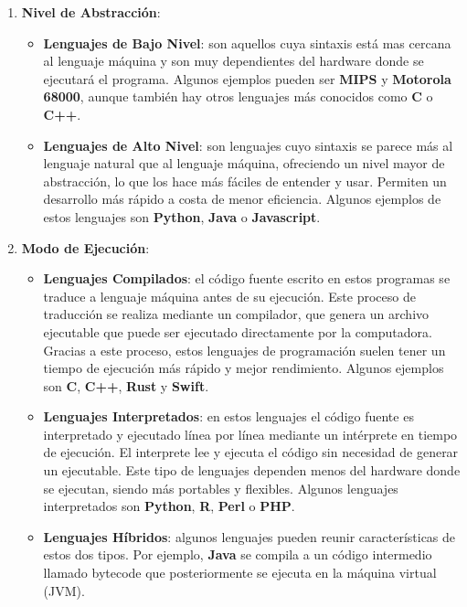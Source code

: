 \begin{enumerate}
	\item \textbf{Nivel de Abstracción}:
		\begin{itemize}
			\item \textbf{Lenguajes de Bajo Nivel}: son aquellos cuya sintaxis está mas cercana al lenguaje máquina y son muy dependientes del hardware donde se ejecutará el programa. Algunos ejemplos pueden ser \textbf{MIPS} y \textbf{Motorola 68000}, aunque también hay otros lenguajes más conocidos como \textbf{C} o \textbf{C++}. 
			
			\item \textbf{Lenguajes de Alto Nivel}: son lenguajes cuyo sintaxis se parece más al lenguaje natural que al lenguaje máquina, ofreciendo un nivel mayor de abstracción, lo que los hace más fáciles de entender y usar. Permiten un desarrollo más rápido a costa de menor eficiencia. Algunos ejemplos de estos lenguajes son \textbf{Python}, \textbf{Java} o \textbf{Javascript}.
		\end{itemize}
		
		\item \textbf{Modo de Ejecución}:
		\begin{itemize}
			\item \textbf{Lenguajes Compilados}: el código fuente escrito en estos programas se traduce a lenguaje máquina antes de su ejecución. Este proceso de traducción se realiza mediante un compilador, que genera un archivo ejecutable que puede ser ejecutado directamente por la computadora. Gracias a este proceso, estos lenguajes de programación suelen tener un tiempo de ejecución más rápido y mejor rendimiento. Algunos ejemplos son \textbf{C}, \textbf{C++}, \textbf{Rust} y \textbf{Swift}.
					
			\item \textbf{Lenguajes Interpretados}: en estos lenguajes el código fuente es interpretado y ejecutado línea por línea mediante un intérprete en tiempo de ejecución. El interprete lee y ejecuta el código sin necesidad de generar un ejecutable. Este tipo de lenguajes dependen menos del hardware donde se ejecutan, siendo más portables y flexibles.  Algunos lenguajes interpretados son \textbf{Python}, \textbf{R}, \textbf{Perl} o \textbf{PHP}.
			
			\item \textbf{Lenguajes Híbridos}: algunos lenguajes pueden reunir características de estos dos tipos. Por ejemplo, \textbf{Java} se compila a un código intermedio llamado \gls{bytecode} que posteriormente se ejecuta en la máquina virtual (JVM).
		\end{itemize}
		

\end{enumerate}
